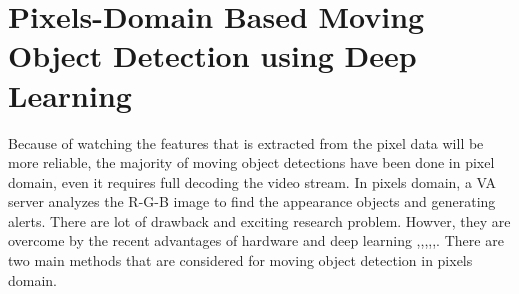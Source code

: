 \section{Pixels-Domain Based Moving Object Detection using Deep Learning}
Because of watching the features that is extracted from the pixel data will be more reliable, the majority of moving object detections have been done in pixel domain, even it requires full decoding the video stream. In pixels domain, a VA server analyzes the R-G-B image to find the appearance objects and generating alerts. There are lot of drawback and exciting research problem. Howver, they are overcome by the recent advantages of hardware and deep learning \cite{zeng2018background},\cite{chen2017pixel},\cite{babaee2018deep},\cite{wang2017interactive},\cite{patil2018msfgnet},\cite{ou2019moving}. There are two main methods that are considered for moving object detection in pixels domain.
